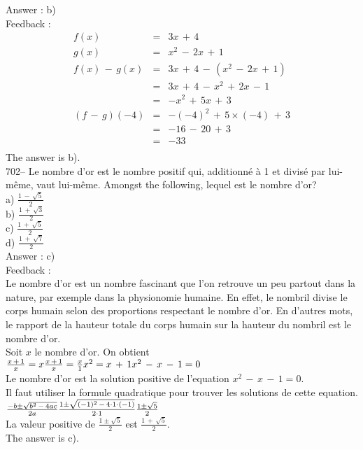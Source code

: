 \documentclass[letterpaper, 12pt]{article}
\begin{document}
Answer : b)\\

Feedback : \\
\begin{eqnarray*}
f(x)&=&3x\,+\,4\\
g(x)&=&x^{2}\,-\,2x\,+\,1\\
f(x)\,-\,g(x)&=&3x\,+\,4\,-\,(x^{2}\,-\,2x\,+\,1)\\
&=&3x\,+\,4\,-\,x^{2}\,+\,2x\,-\,1\\
&=&-x^{2}\,+\,5x\,+\,3\\
(f\,-\,g)(-4)&=& - (-4)^{2}\,+\,5\times(-4)\,+\,3\\
&=&-16\,-\,20\,+\,3\\
&=&-33\\
\end{eqnarray*}
The answer is b).\\

702-- Le nombre d'or est le nombre positif qui, additionn\'e \`a 1 et
divis\'e par lui-m\^eme, vaut lui-m\^eme.  Amongst the following,
lequel est le nombre d'or?\\
a) $\frac{1\,-\,\sqrt{5}}{2}$\\
b) $\frac{1\,+\,\sqrt{3}}{2}$\\
c) $\frac{1\,+\,\sqrt{5}}{2}$\\
d) $\frac{1\,+\,\sqrt{7}}{2}$\\

Answer : c)\\

Feedback : \\
Le nombre d'or est un nombre fascinant que l'on retrouve un peu partout dans
la nature, par exemple dans la physionomie humaine. En effet, le nombril
divise le corps humain selon des proportions respectant le nombre d'or.  En
d'autres mots, le rapport de la hauteur totale du corps humain sur la
hauteur du nombril est le nombre d'or.\\
Soit $x$ le nombre d'or.  On obtient\\[2mm]
$\frac{x\,+\,1}{x}=x\\[2mm]
\frac{x\,+\,1}{x}=\frac{x}{1}\\[2mm]
x^{2}=x\,+\,1\\[2mm]
x^{2}\,-\,x\,-\,1=0$\\[2mm]
Le nombre d'or est la solution positive de l'equation
$x^{2}\,-\,x\,-\,1=0$.\\
Il faut utiliser la formule quadratique pour trouver les solutions de cette
equation.\\[2mm]
$\frac{-b\pm\sqrt{b^{2}\,-\,4ac}}{2a}\\[2mm]
\frac{1\pm\sqrt{(-1)^{2}\,-\,4\cdot1\cdot(-1)}}{2\cdot1}\\[2mm]
\frac{1\pm\sqrt{5}}{2}$\\[2mm]
La valeur positive de $\frac{1\pm\sqrt{5}}{2}$ est
$\frac{1\,+\,\sqrt{5}}{2}$.\\[2mm]
The answer is c).\\
\end{document}
